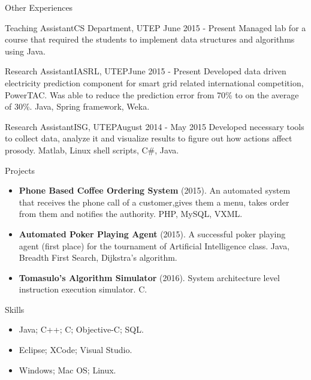 \documentclass[]{mcdowellcv}
\begin{document}
	\begin{cvsection}{Other Experiences}
		\begin{cvsubsection}{Teaching Assistant}{CS Department, UTEP }{June 2015 - Present}
			Managed lab for a course that required the students to implement data structures and algorithms using Java.
		\end{cvsubsection}
		\begin{cvsubsection}{Research Assistant}{IASRL, UTEP}{June 2015 - Present}
			Developed data driven electricity prediction component for smart grid related international competition, PowerTAC. Was able to reduce the prediction error from 70\% to on the average of 30\%. Java, Spring framework, Weka.
		\end{cvsubsection}
		
		\begin{cvsubsection}{Research Assistant}{ISG, UTEP}{August 2014 - May 2015} 
			Developed necessary tools to collect data, analyze it and visualize results to figure out how actions affect prosody. Matlab, Linux shell scripts, C\#, Java.
		\end{cvsubsection}
	\end{cvsection}
	
	
	\begin{cvsection}{Projects}
		\begin{cvsubsection}{}{}{}
			\begin{itemize}
				\item \textbf{Phone Based Coffee Ordering System} (2015). An automated system that receives the phone call of a customer,gives them a menu, takes order from them and notifies the authority.  PHP, MySQL, VXML.
				\item \textbf{Automated Poker Playing Agent} (2015). A successful poker playing agent (first place) for the tournament of Artificial Intelligence class.  Java, Breadth First Search, Dijkstra's algorithm.
				\item \textbf{Tomasulo's Algorithm Simulator} (2016).  System architecture level instruction execution simulator. C.
			\end{itemize}
		\end{cvsubsection}
	\end{cvsection}
	
	
	\begin{cvsection}{Skills}
		\begin{cvsubsection}{}{}{}	
			\begin{itemize}
				\item Java; C++; C; Objective-C; SQL.  
				\item Eclipse; XCode; Visual Studio.
				\item Windows; Mac OS; Linux. 
			\end{itemize}
		\end{cvsubsection}
	\end{cvsection}
	
\end{document}
